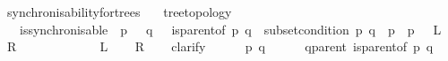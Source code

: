 \begin{isabellebody}
\isamarkupfalse%
\ synchronisability{\isacharunderscore}{\kern0pt}for{\isacharunderscore}{\kern0pt}trees{\isacharcolon}{\kern0pt}\isanewline
\ \ \ {\isachardoublequoteopen}tree{\isacharunderscore}{\kern0pt}topology{\isachardoublequoteclose}\ \isanewline
\ \ \ {\isachardoublequoteopen}is{\isacharunderscore}{\kern0pt}synchronisable\ {\isasymlongleftrightarrow}\ {\isacharparenleft}{\kern0pt}{\isacharparenleft}{\kern0pt}{\isasymforall}p\ {\isasymin}\ {\isasymP}{\isachardot}{\kern0pt}\ {\isasymforall}q\ {\isasymin}\ {\isasymP}{\isachardot}{\kern0pt}\ {\isacharparenleft}{\kern0pt}{\isacharparenleft}{\kern0pt}is{\isacharunderscore}{\kern0pt}parent{\isacharunderscore}{\kern0pt}of\ p\ q{\isacharparenright}{\kern0pt}\ {\isasymlongrightarrow}\ {\isacharparenleft}{\kern0pt}{\isacharparenleft}{\kern0pt}subset{\isacharunderscore}{\kern0pt}condition\ p\ q{\isacharparenright}{\kern0pt}\ {\isasymand}\ {\isacharparenleft}{\kern0pt}{\isacharparenleft}{\kern0pt}{\isasymL}\isactrlsup {\isacharasterisk}{\kern0pt}{\isacharparenleft}{\kern0pt}p{\isacharparenright}{\kern0pt}{\isacharparenright}{\kern0pt}\ {\isacharequal}{\kern0pt}\ {\isacharparenleft}{\kern0pt}{\isasymL}\isactrlsup {\isacharasterisk}{\kern0pt}\isactrlsub {\isasymsqunion}\isactrlsub {\isasymsqunion}{\isacharparenleft}{\kern0pt}p{\isacharparenright}{\kern0pt}{\isacharparenright}{\kern0pt}{\isacharparenright}{\kern0pt}{\isacharparenright}{\kern0pt}\ {\isacharparenright}{\kern0pt}{\isacharparenright}{\kern0pt}{\isacharparenright}{\kern0pt}{\isachardoublequoteclose}\ {\isacharparenleft}{\kern0pt}\ {\isachardoublequoteopen}{\isacharquery}{\kern0pt}L\ {\isasymlongleftrightarrow}\ {\isacharquery}{\kern0pt}R{\isachardoublequoteclose}{\isacharparenright}{\kern0pt}\isanewline
\ \ \ \ \isanewline
%
\isadelimproof
%
\endisadelimproof
%
\isatagproof
{}\isamarkupfalse%
\ \isanewline
\ \ \isanewline
\ \ \isamarkupfalse%
\ {\isachardoublequoteopen}{\isacharquery}{\kern0pt}L{\isachardoublequoteclose}\isanewline
\ \ \isamarkupfalse%
\ {\isachardoublequoteopen}{\isacharquery}{\kern0pt}R{\isachardoublequoteclose}\isanewline
\ \ \isamarkupfalse%
\ clarify\isanewline
\ \ \ \ \isamarkupfalse%
\ p\ q\isanewline
\ \ \ \ \isamarkupfalse%
\ q{\isacharunderscore}{\kern0pt}parent{\isacharcolon}{\kern0pt}\ {\isachardoublequoteopen}is{\isacharunderscore}{\kern0pt}parent{\isacharunderscore}{\kern0pt}of\ p\ q{\isachardoublequoteclose}\isanewline

\end{isabellebody}

